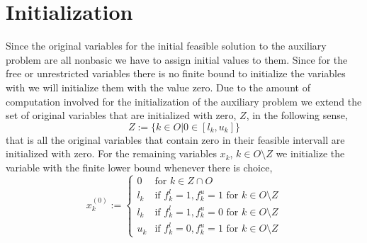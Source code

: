\documentclass[a4paper]{article}
\begin{document}
\section{Initialization}
Since the original variables for the initial feasible solution to the auxiliary problem are all nonbasic we have to assign initial values to them. Since for the free or unrestricted variables there is no finite bound to initialize the variables with we will initialize them with the value zero. Due to the amount of computation involved for the initialization of the auxiliary problem we extend the set of original variables that are initialized with zero, $Z$, in the following sense, 
\begin{equation}
\label{def:Z}
Z:=\{ k \in O \left|\right. 0 \in \left[l_{k}, u_{k}\right]\} 
\end{equation}
that is all the original variables that contain zero in their feasible intervall are initialized with zero. For the remaining variables $x_{k}$,
$k \in O \setminus Z$ we initialize the variable with the finite lower bound whenever there is choice,
\begin{equation}
x_{k}^{(0)}:=\left\{
\begin{array}{ll}
0
&
\mbox{for $k \in Z \cap O$} \\
l_{k}
&
\mbox{if $f_{k}^{l}=1, f_{k}^{u}=1$ for $k \in O \setminus Z$} \\
l_{k}
&
\mbox{if $f_{k}^{l}=1, f_{k}^{u}=0$ for $k \in O \setminus Z$} \\
u_{k}
&
\mbox{if $f_{k}^{l}=0, f_{k}^{u}=1$ for $k \in O \setminus Z$}
\end{array}
\right.
\end{equation}
\end{document}

